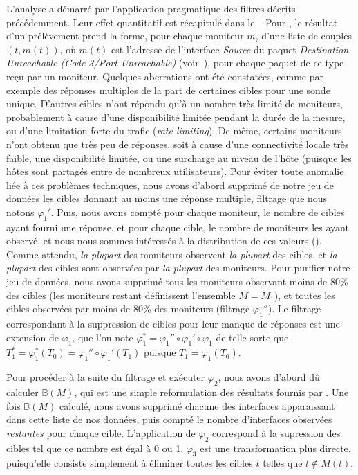 L'analyse a démarré par l'application pragmatique des filtres décrits
précédemment. Leur effet quantitatif est récapitulé dans
le~. Pour \udpping, le résultat d'un
prélèvement prend la forme, pour chaque moniteur $m$, d'une liste de couples
$(t, m(t))$, où $m(t)$ est l'adresse de l'interface \emph{Source} du paquet
\icmp \emph{Destination Unreachable (Code 3/Port Unreachable)}
(voir~), pour chaque paquet de ce type reçu par un
moniteur. Quelques aberrations ont été constatées, comme par exemple des
réponses multiples de la part de certaines cibles pour une sonde unique.
D'autres cibles n'ont répondu qu'à un nombre très limité de moniteurs,
probablement à cause d'une disponibilité limitée pendant la durée de la mesure,
ou d'une limitation forte du trafic \icmp ({\em rate limiting}). De même,
certains moniteurs n'ont obtenu que très peu de réponses, soit à cause d'une
connectivité locale très faible, une disponibilité limitée, ou une surcharge au
niveau de l'hôte \planetlab (puisque les hôtes \planetlab sont partagés entre de
nombreux utilisateurs). Pour éviter toute anomalie liée à ces problèmes
techniques, nous avons d'abord supprimé de notre jeu de données les cibles
donnant au moins une réponse multiple, filtrage que nous notons $\varphi_1'$.
Puis, nous avons compté pour chaque moniteur, le nombre de cibles ayant fourni
une réponse, et pour chaque cible, le nombre de moniteurs les ayant observé, et
nous nous sommes intéressés à la distribution de ces valeurs
().
Comme attendu, {\em la plupart} des moniteurs observent {\em la plupart} des
cibles, et {\em la plupart} des cibles sont observées par {\em la plupart} des
moniteurs. Pour purifier notre jeu de données, nous avons supprimé tous les
moniteurs observant moins de 80\% des cibles (les moniteurs restant définissent
l'ensemble $M = M_1$), et toutes les cibles observées par moins de 80\% des
moniteurs (filtrage $\varphi_1''$). Le filtrage correspondant à la suppression
de cibles pour leur manque de réponses est une extension de
$\varphi_1$, que l'on note $\varphi_1^* = \varphi_1'' \circ \varphi_1' \circ
\varphi_1$ de telle sorte que $T_1^* = \varphi_1^*(T_0) = \varphi_1'' \circ
\varphi_1'(T_1)$ puisque $T_1 = \varphi_1(T_0)$.

Pour procéder à la suite du filtrage et exécuter $\varphi_2$, nous avons d'abord
dû calculer ${\mathbb B}(M)$, qui est une simple reformulation des résultats
fournis par \udpping. Une fois ${\mathbb B}(M)$ calculé, nous avons supprimé
chacune des interfaces apparaissant dans cette liste de nos données, puis compté
le nombre d'interfaces observées {\em restantes} pour chaque cible.
L'application de $\varphi_2$ correspond à la supression des cibles tel que ce
nombre est égal à 0 ou 1. $\varphi_3$ est une transformation plus directe,
puisqu'elle consiste simplement à éliminer toutes les cibles $t$ telles que $t
\notin M(t)$.

